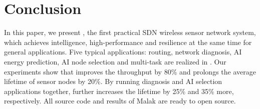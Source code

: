 \section{Conclusion}
\label{Con}

In this paper, we present {\sdn}, the first practical SDN 
wireless sensor network system,
which achieves intelligence, high-performance and 
resilience at the same time for general applications. 
Five typical applications: routing, network diagnosis, AI energy prediction, 
AI node selection and multi-task are realized in {\sdn}.
Our experiments show that {\sdn} 
improves the throughput by 80\% and prolongs the average lifetime of sensor nodes by 20\%. 
By running diagnosis and AI selection applications together, 
{\sdn} further increases the lifetime by 25\% and 35\% more, respectively.
All source code and results of Malak are ready to open source.

